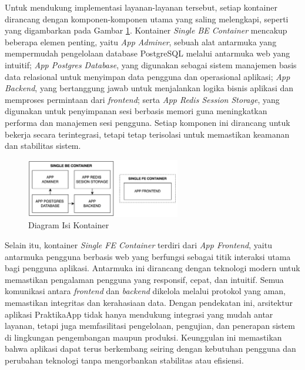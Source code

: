 Untuk mendukung implementasi layanan-layanan tersebut, setiap kontainer dirancang dengan komponen-komponen utama yang saling melengkapi, seperti yang digambarkan pada Gambar \ref{fig:container_contents}. Kontainer \emph{Single BE Container} mencakup beberapa elemen penting, yaitu \emph{App Adminer}, sebuah alat antarmuka yang mempermudah pengelolaan database PostgreSQL melalui antarmuka web yang intuitif; \emph{App Postgres Database}, yang digunakan sebagai sistem manajemen basis data relasional untuk menyimpan data pengguna dan operasional aplikasi; \emph{App Backend}, yang bertanggung jawab untuk menjalankan logika bisnis aplikasi dan memproses permintaan dari \emph{frontend}; serta \emph{App Redis Session Storage}, yang digunakan untuk penyimpanan sesi berbasis memori guna meningkatkan performa dan manajemen sesi pengguna. Setiap komponen ini dirancang untuk bekerja secara terintegrasi, tetapi tetap terisolasi untuk memastikan keamanan dan stabilitas sistem.

\begin{figure}[H]
    \centering
    \includegraphics[width=0.6\textwidth]{gambar/container.png}
    \caption{Diagram Isi Kontainer}
    \label{fig:container_contents}
\end{figure}

Selain itu, kontainer \emph{Single FE Container} terdiri dari \emph{App Frontend}, yaitu antarmuka pengguna berbasis web yang berfungsi sebagai titik interaksi utama bagi pengguna aplikasi. Antarmuka ini dirancang dengan teknologi modern untuk memastikan pengalaman pengguna yang responsif, cepat, dan intuitif. Semua komunikasi antara \emph{frontend} dan \emph{backend} dikelola melalui protokol yang aman, memastikan integritas dan kerahasiaan data. Dengan pendekatan ini, arsitektur aplikasi PraktikaApp tidak hanya mendukung integrasi yang mudah antar layanan, tetapi juga memfasilitasi pengelolaan, pengujian, dan penerapan sistem di lingkungan pengembangan maupun produksi. Keunggulan ini memastikan bahwa aplikasi dapat terus berkembang seiring dengan kebutuhan pengguna dan perubahan teknologi tanpa mengorbankan stabilitas atau efisiensi.

